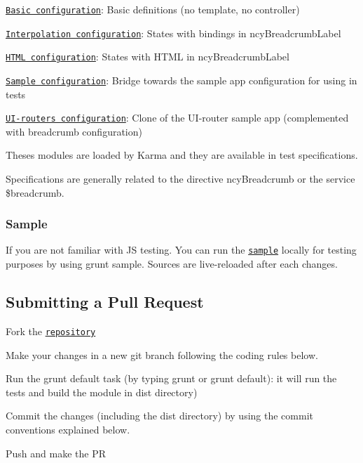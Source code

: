 \begin{DoxyItemize}
\item \href{https://github.com/ncuillery/angular-breadcrumb/blob/master/test/mock/test-modules.js#L6}{\tt Basic configuration}\+: Basic definitions (no template, no controller)
\item \href{https://github.com/ncuillery/angular-breadcrumb/blob/master/test/mock/test-modules.js#L21}{\tt Interpolation configuration}\+: States with bindings in {\ttfamily ncy\+Breadcrumb\+Label}
\item \href{https://github.com/ncuillery/angular-breadcrumb/blob/master/test/mock/test-modules.js#L36}{\tt H\+T\+ML configuration}\+: States with H\+T\+ML in {\ttfamily ncy\+Breadcrumb\+Label}
\item \href{https://github.com/ncuillery/angular-breadcrumb/blob/master/test/mock/test-modules.js#L41}{\tt Sample configuration}\+: Bridge towards the sample app configuration for using in tests
\item \href{https://github.com/ncuillery/angular-breadcrumb/blob/master/test/mock/test-ui-router-sample.js#L9}{\tt U\+I-\/router\textquotesingle{}s configuration}\+: Clone of the U\+I-\/router sample app (complemented with breadcrumb configuration)
\end{DoxyItemize}

Theses modules are loaded by Karma and they are available in test specifications.

Specifications are generally related to the directive {\ttfamily ncy\+Breadcrumb} or the service {\ttfamily \$breadcrumb}.

\subsubsection*{Sample}

If you are not familiar with JS testing. You can run the \href{http://ncuillery.github.io/angular-breadcrumb/#/sample}{\tt sample} locally for testing purposes by using {\ttfamily grunt sample}. Sources are live-\/reloaded after each changes.

\subsection*{Submitting a Pull Request}


\begin{DoxyItemize}
\item Fork the \href{https://github.com/ncuillery/angular-breadcrumb/}{\tt repository}
\item Make your changes in a new git branch following the coding rules below.
\item Run the grunt default task (by typing {\ttfamily grunt} or {\ttfamily grunt default})\+: it will run the tests and build the module in {\ttfamily dist} directory)
\item Commit the changes (including the {\ttfamily dist} directory) by using the commit conventions explained below.
\item Push and make the PR
\end{DoxyItemize}

